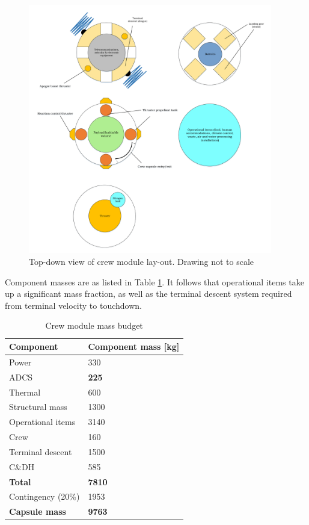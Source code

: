 \begin{figure}[h]
		\centering
		\includegraphics[width=0.95\textwidth]{./Figure/CrewModule/TopviewV2.pdf}
		\caption[Top-down view of crew module lay-out]{Top-down view of crew module lay-out. Drawing not to scale}
		\label{fig:topview}
\end{figure}

Component masses are as listed in Table \ref{tab:crewmass}. It follows that operational items take up a significant mass fraction, as well as the terminal descent system required from terminal velocity to touchdown.

\begin{table}[h]
\centering
\caption{Crew module mass budget}
\label{tab:crewmass}
\begin{tabular}{|l|l|}
\hline
{\bf Component}    & {\bf Component mass {[}kg{]}} \\ \hline
Power              & 330                           \\ \hline
 ADCS        & {\bf 225}                     \\ \hline
Thermal            & 600                           \\ \hline
Structural mass    & 1300                          \\ \hline
Operational items  & 3140                          \\ \hline
Crew               & 160                           \\ \hline
Terminal descent   & 1500                          \\ \hline
C\&DH              & 585                           \\ \hline \hline
{\bf Total}        & {\bf 7810}                    \\ \hline
Contingency (20\%)   & 1953                          \\ \hline \hline
{\bf Capsule mass} & {\bf 9763}                    \\ \hline
\end{tabular}
\end{table}


